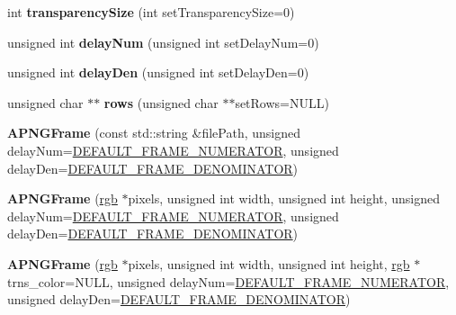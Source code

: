 \begin{DoxyCompactItemize}
\item 
\hypertarget{classapngasm_1_1APNGFrame_adb569119e5de304fd914a426b8eb8344}{int {\bfseries transparency\-Size} (int set\-Transparency\-Size=0)}\label{classapngasm_1_1APNGFrame_adb569119e5de304fd914a426b8eb8344}

\item 
\hypertarget{classapngasm_1_1APNGFrame_a43419897a5e90845a9b861b1bc2b0a00}{unsigned int {\bfseries delay\-Num} (unsigned int set\-Delay\-Num=0)}\label{classapngasm_1_1APNGFrame_a43419897a5e90845a9b861b1bc2b0a00}

\item 
\hypertarget{classapngasm_1_1APNGFrame_a10536e9d54229720b5bce2d61547a1b0}{unsigned int {\bfseries delay\-Den} (unsigned int set\-Delay\-Den=0)}\label{classapngasm_1_1APNGFrame_a10536e9d54229720b5bce2d61547a1b0}

\item 
\hypertarget{classapngasm_1_1APNGFrame_a690460ddd31f4b2a199153ba850b6f6f}{unsigned char $\ast$$\ast$ {\bfseries rows} (unsigned char $\ast$$\ast$set\-Rows=N\-U\-L\-L)}\label{classapngasm_1_1APNGFrame_a690460ddd31f4b2a199153ba850b6f6f}

\item 
\hypertarget{classapngasm_1_1APNGFrame_a258b93f5179fab0e04af0ed0697f2893}{{\bfseries A\-P\-N\-G\-Frame} (const std\-::string \&file\-Path, unsigned delay\-Num=\hyperlink{namespaceapngasm_a5b334b6957e14291ff8f76cab562f60f}{D\-E\-F\-A\-U\-L\-T\-\_\-\-F\-R\-A\-M\-E\-\_\-\-N\-U\-M\-E\-R\-A\-T\-O\-R}, unsigned delay\-Den=\hyperlink{namespaceapngasm_a867b3acbcc2624faf6b3e82732110594}{D\-E\-F\-A\-U\-L\-T\-\_\-\-F\-R\-A\-M\-E\-\_\-\-D\-E\-N\-O\-M\-I\-N\-A\-T\-O\-R})}\label{classapngasm_1_1APNGFrame_a258b93f5179fab0e04af0ed0697f2893}

\item 
\hypertarget{classapngasm_1_1APNGFrame_afd794300a428dc7c60686cfc92d9356a}{{\bfseries A\-P\-N\-G\-Frame} (\hyperlink{structapngasm_1_1rgb}{rgb} $\ast$pixels, unsigned int width, unsigned int height, unsigned delay\-Num=\hyperlink{namespaceapngasm_a5b334b6957e14291ff8f76cab562f60f}{D\-E\-F\-A\-U\-L\-T\-\_\-\-F\-R\-A\-M\-E\-\_\-\-N\-U\-M\-E\-R\-A\-T\-O\-R}, unsigned delay\-Den=\hyperlink{namespaceapngasm_a867b3acbcc2624faf6b3e82732110594}{D\-E\-F\-A\-U\-L\-T\-\_\-\-F\-R\-A\-M\-E\-\_\-\-D\-E\-N\-O\-M\-I\-N\-A\-T\-O\-R})}\label{classapngasm_1_1APNGFrame_afd794300a428dc7c60686cfc92d9356a}

\item 
\hypertarget{classapngasm_1_1APNGFrame_a5d273fea8e908606a01f252a5ea19cdb}{{\bfseries A\-P\-N\-G\-Frame} (\hyperlink{structapngasm_1_1rgb}{rgb} $\ast$pixels, unsigned int width, unsigned int height, \hyperlink{structapngasm_1_1rgb}{rgb} $\ast$trns\-\_\-color=N\-U\-L\-L, unsigned delay\-Num=\hyperlink{namespaceapngasm_a5b334b6957e14291ff8f76cab562f60f}{D\-E\-F\-A\-U\-L\-T\-\_\-\-F\-R\-A\-M\-E\-\_\-\-N\-U\-M\-E\-R\-A\-T\-O\-R}, unsigned delay\-Den=\hyperlink{namespaceapngasm_a867b3acbcc2624faf6b3e82732110594}{D\-E\-F\-A\-U\-L\-T\-\_\-\-F\-R\-A\-M\-E\-\_\-\-D\-E\-N\-O\-M\-I\-N\-A\-T\-O\-R})}\label{classapngasm_1_1APNGFrame_a5d273fea8e908606a01f252a5ea19cdb}


\end{DoxyCompactItemize}
